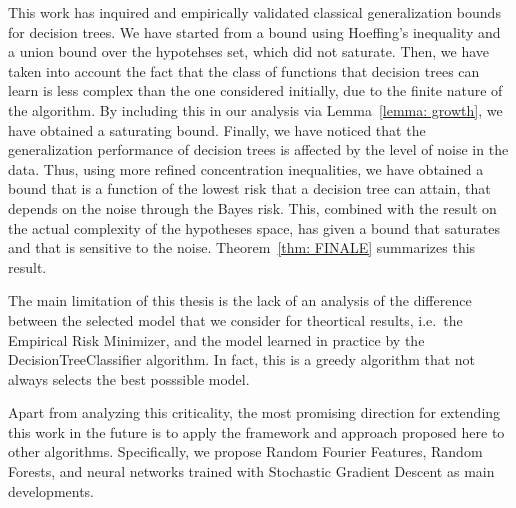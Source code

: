 \documentclass[reqno]{amsart}
\begin{document}
This work has inquired and empirically validated classical generalization bounds for decision trees. We have started from a bound using Hoeffing's inequality and a union bound over the hypotehses set, which did not saturate. Then, we have taken into account the fact that the class of functions that decision trees can learn is less complex than the one considered initially, due to the finite nature of the algorithm. By including this in our analysis via Lemma~\ref{lemma: growth}, we have obtained a saturating bound. Finally, 
we have noticed that the generalization performance of decision trees is affected by the level of noise in the data. Thus, using more refined concentration inequalities, we have obtained a bound that is a function of the lowest risk that a decision tree can attain, that depends on the noise through the Bayes risk. This, combined with the result on the actual complexity of the hypotheses space, has given a bound that saturates and that is sensitive to the noise. Theorem~\ref{thm: FINALE} summarizes this result. 

The main limitation of this thesis is the lack of an analysis of the difference between the selected model that we consider for theortical results, i.e.\ the Empirical Risk Minimizer, and the model learned in practice by the DecisionTreeClassifier algorithm. In fact, this is a greedy algorithm that not always selects the best posssible model. 

Apart from analyzing this criticality, the most promising direction for extending this work in the future is to apply the framework and approach proposed here to other algorithms. Specifically, we propose Random Fourier Features, Random Forests, and neural networks trained with Stochastic Gradient Descent as main developments. 

\newpage



\newpage
\appendix

\end{document}
